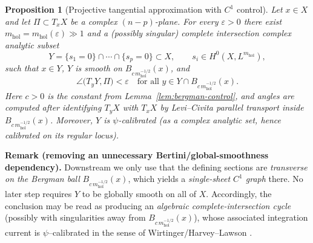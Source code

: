 \documentclass[11pt]{article}
\newcommand{\REVMZ}[1]{\textcolor{teal}{#1}}  %
\numberwithin{equation}{section}  %
\theoremstyle{plain}
\newtheorem{proposition}[theorem]{Proposition}
\theoremstyle{definition}
\theoremstyle{remark}
\newcommand{\mhol}{m_{\mathrm{hol}}} %
\begin{document}
\begin{proposition}[Projective tangential approximation with $C^1$ control]

\label{prop:tangent-approx-full}\label{thm:tangent-approx}
Let $x\in X$ and let $\Pi\subset T_xX$ be a complex $(n-p)$-plane.
For every $\varepsilon>0$ there exist $\mhol=\mhol(\varepsilon)\gg 1$ and a (possibly singular) complete intersection complex analytic subset
\[
Y = \{s_1=0\}\cap \cdots \cap \{s_p=0\}\subset X,
\qquad s_i\in H^0(X,L^{\mhol}),
\]
such that $x\in Y$, $Y$ is smooth on $B_{c\,\mhol^{-1/2}}(x)$, and
\[
\angle\bigl(T_yY,\Pi\bigr)<\varepsilon
\quad\text{for all } y\in Y\cap B_{c\,\mhol^{-1/2}}(x).
\]
Here $c>0$ is the constant from Lemma~\ref{lem:bergman-control}, and angles are computed after identifying $T_yX$ with $T_xX$ by Levi--Civita parallel transport \REVMZ{\cite{GH78}} inside $B_{c\,\mhol^{-1/2}}(x)$.
Moreover, $Y$ is $\psi$-calibrated (as a complex analytic set, hence calibrated on its regular locus).
\end{proposition}




\noindent\textbf{Remark (removing an unnecessary Bertini/global-smoothness dependency).}
Downstream we only use that the defining sections are \emph{transverse on the Bergman ball}
$B_{c\,\mhol^{-1/2}}(x)$, which yields a \emph{single-sheet $C^1$ graph} there.
No later step requires $Y$ to be globally smooth on all of $X$.
Accordingly, the conclusion may be read as producing an \emph{algebraic complete-intersection cycle}
(possibly with singularities away from $B_{c\,\mhol^{-1/2}}(x)$), whose associated integration current is
$\psi$--calibrated in the sense of Wirtinger/Harvey--Lawson \REVMZ{\cite[Thm~4.2]{HL82}}.
\end{document}
